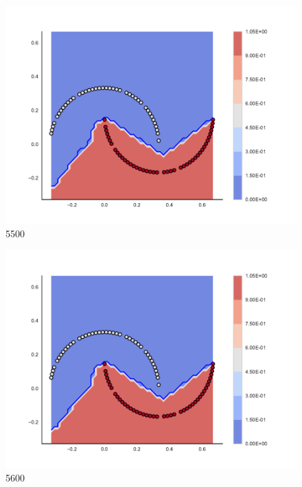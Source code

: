 \begin{subfigure}[b]{0.09\textwidth}
    \includegraphics[clip, trim=2.35cm 1.75cm 4.5cm 0cm,width=\textwidth]{img/convergence/5500.pdf}
    \caption{5500}
    \label{fig:convergence_5500}
\end{subfigure}
%
\begin{subfigure}[b]{0.09\textwidth}
    \includegraphics[clip, trim=2.35cm 1.75cm 4.5cm 0cm,width=\textwidth]{img/convergence/5600.pdf}
    \caption{5600}
    \label{fig:convergence_5600}
\end{subfigure}
%

